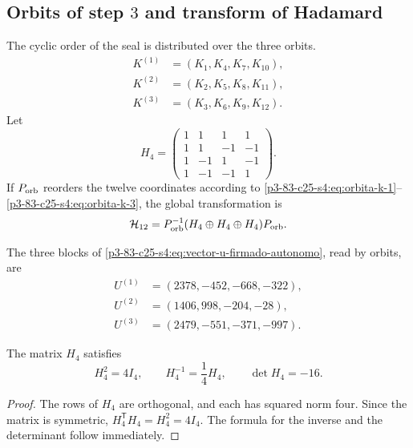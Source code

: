 \subsection{Orbits of step \(3\) and transform of Hadamard}

The cyclic order of the seal is distributed over the three orbits.
\begin{align}
 K^{(1)}&=(K_1,K_4,K_7,K_{10}),
 \label{p3-83-c25-s4:eq:orbita-k-1}\\
 K^{(2)}&=(K_2,K_5,K_8,K_{11}),
 \label{p3-83-c25-s4:eq:orbita-k-2}\\
 K^{(3)}&=(K_3,K_6,K_9,K_{12}).
 \label{p3-83-c25-s4:eq:orbita-k-3}
\end{align}
Let
\begin{equation}
 H_4=
 \begin{pmatrix}
 1&1&1&1\\
 1&1&-1&-1\\
 1&-1&1&-1\\
 1&-1&-1&1
 \end{pmatrix}.
 \label{p3-83-c25-s4:eq:matriz-hadamard-cuatro-autonoma}
\end{equation}
If \(P_{\rm orb}\) reorders the twelve coordinates according to
\eqref{p3-83-c25-s4:eq:orbita-k-1}--\eqref{p3-83-c25-s4:eq:orbita-k-3}, the global transformation is
\begin{equation}
 \mathcal H_{12}
 =P_{\rm orb}^{-1}
 (H_4\oplus H_4\oplus H_4)P_{\rm orb}.
 \label{p3-83-c25-s4:eq:hadamard-global-doce}
\end{equation}

The three blocks of \eqref{p3-83-c25-s4:eq:vector-u-firmado-autonomo}, read by
orbits, are
\begin{align*}
 U^{(1)}&=(2378,-452,-668,-322),\\
 U^{(2)}&=(1406,998,-204,-28),\\
 U^{(3)}&=(2479,-551,-371,-997).
\end{align*}

\begin{lemma}
\label{p3-83-c25-s4:lem:cuarto-inversa-hadamard}
The matrix \(H_4\) satisfies
\begin{equation}
 H_4^2=4I_4,
 \qquad
 H_4^{-1}=\frac14H_4,
 \qquad
 \det H_4=-16.
 \label{p3-83-c25-s4:eq:identidades-hadamard-cuatro}
\end{equation}
\end{lemma}

\begin{proof}
The rows of \(H_4\) are orthogonal, and each has squared norm four.
Since the matrix is symmetric, \(H_4^{\mathsf T}H_4=H_4^2=4I_4\). The
formula for the inverse and the determinant follow immediately.
\end{proof}

